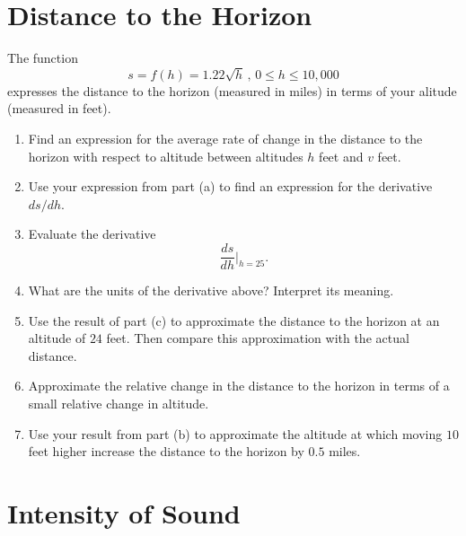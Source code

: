 \documentclass{ximera}
\begin{document}
\section{Distance to the Horizon}

\begin{question} \label{Qdggbrgthghghb}
The function
\[
      s = f(h) = 1.22\sqrt{h} \, , \, 0\leq h \leq 10,000
\]
expresses the distance to the horizon (measured in miles) in terms of your alitude (measured in feet).

\begin{enumerate}
\item Find an expression for the average rate of change in the distance to the horizon with respect to altitude between altitudes $h$ feet and $v$ feet.

\item Use your expression from part (a) to find an expression for the derivative $ds/dh$.

\item Evaluate the derivative 
\[
       \frac{ds}{dh}\Big|_{h=25} .
\]

\item What are the units of the derivative above? Interpret its meaning.

\item Use the result of part (c) to approximate the distance to the horizon at an altitude of $24$ feet. Then compare this approximation with the actual distance.

\item Approximate the relative change in the distance to the horizon in terms of a small relative change in altitude.

\item Use your result from part (b) to approximate the altitude at which moving $10$ feet higher increase the distance to the horizon by $0.5$ miles.

\end{enumerate}
\end{question}




\section{Intensity of Sound}
\end{document}
